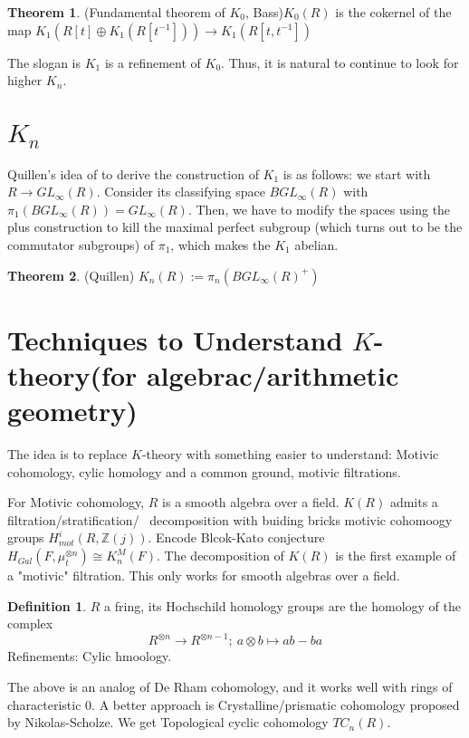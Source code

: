 \documentclass{article}
\theoremstyle{definition}
\newtheorem{theorem}{Theorem}[section]
\theoremstyle{definition}
\newtheorem{definition}{Definition}[section]
\theoremstyle{definition}
\theoremstyle{definition}
\theoremstyle{definition}
\theoremstyle{definition}
\theoremstyle{definition}
\begin{document}
\begin{tcolorbox}[colback=red!5!white,colframe=red!30!white]
\begin{theorem}
(Fundamental theorem of $K_0$, Bass)$K_0(R)$ is the cokernel of the map 
$K_1(R[t]\oplus K_1(R[t ^{-1}]))\to K_1(R[t,t ^{-1}])$
\end{theorem}
\end{tcolorbox}
The slogan is $K_1$ is a refinement of $K_0$. Thus, it is natural to continue to look for higher $K_n$.

\section{$K_n$}

Quillen's idea of to derive the construction of $K_1$ is as follows: we start with $R\to GL_{\infty}(R)$. Consider its classifying space $BGL_{\infty}(R)$ with $\pi_1(BGL_{\infty}(R))=GL_{\infty}(R)$. Then, we have to modify the spaces using the plus construction to kill the maximal perfect subgroup (which turns out to be the commutator subgroups) of $\pi_1$, which makes the $K_1$ abelian. 

\begin{tcolorbox}[colback=red!5!white,colframe=red!30!white]
\begin{theorem}
(Quillen) $K_n(R):=\pi_n(BGL_{\infty}(R)^+)$
\end{theorem}
\end{tcolorbox}

\section{Techniques to Understand $K$-theory(for algebrac/arithmetic geometry)}
The idea is to replace $K$-theory with something easier to understand: Motivic cohomology, cylic homology and a common ground, motivic filtrations. 

For Motivic cohomology, $R$ is a smooth algebra over a field. $K(R)$ admits a filtration/stratification/ \ decomposition with buiding bricks motivic cohomoogy groups $H^i_{mot}(R,\mathbb{Z}(j))$. Encode Blcok-Kato conjecture $H_{Gal}(F,\mu_t^{\otimes n})\cong K^M_n(F)$. The decomposition of $K(R)$ is the first example of a "motivic" filtration. This only works for smooth algebras over a field. 


\begin{tcolorbox}[colback=purple!5!white,colframe=purple!75!black]
\begin{definition}
$R$ a fring, its Hochschild homology groups are the homology of the complex
\[
    R^{\otimes n}\to R^{\otimes n-1};\  a\otimes b\mapsto ab-ba
\]
Refinements: Cylic hmoology.
\end{definition}
\end{tcolorbox}
The above is an analog of De Rham cohomology, and it works well with rings of characteristic $0$. A better approach is Crystalline/prismatic cohomology proposed by Nikolas-Scholze. We get Topological cyclic cohomology $TC_n(R)$. 
\end{document}
